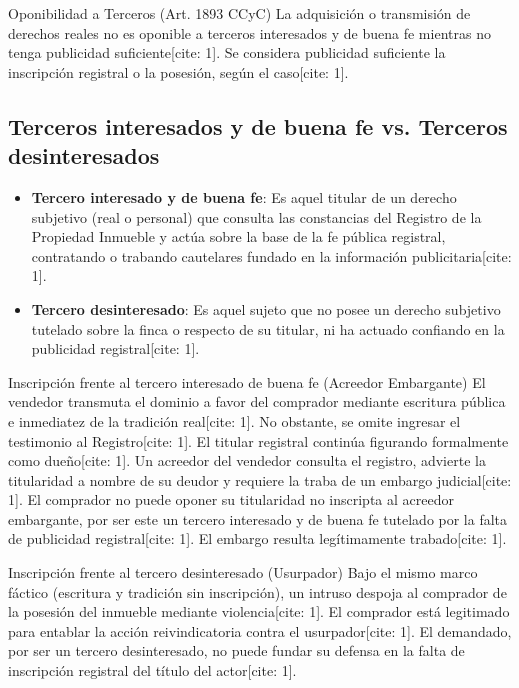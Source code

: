 \documentclass[12pt,oneside]{book}
\begin{document}
\begin{definition}{Oponibilidad a Terceros (Art. 1893 CCyC)}
La adquisición o transmisión de derechos reales no es oponible a terceros interesados y de buena fe mientras no tenga publicidad suficiente[cite: 1]. Se considera publicidad suficiente la inscripción registral o la posesión, según el caso[cite: 1].
\end{definition}

\subsection{Terceros interesados y de buena fe vs. Terceros desinteresados}

\begin{itemize}
    \item \textbf{Tercero interesado y de buena fe}: Es aquel titular de un derecho subjetivo (real o personal) que consulta las constancias del Registro de la Propiedad Inmueble y actúa sobre la base de la fe pública registral, contratando o trabando cautelares fundado en la información publicitaria[cite: 1].
    \item \textbf{Tercero desinteresado}: Es aquel sujeto que no posee un derecho subjetivo tutelado sobre la finca o respecto de su titular, ni ha actuado confiando en la publicidad registral[cite: 1].
\end{itemize}

\begin{example}{Inscripción frente al tercero interesado de buena fe (Acreedor Embargante)}
El vendedor transmuta el dominio a favor del comprador mediante escritura pública e inmediatez de la tradición real[cite: 1]. No obstante, se omite ingresar el testimonio al Registro[cite: 1]. El titular registral continúa figurando formalmente como dueño[cite: 1]. Un acreedor del vendedor consulta el registro, advierte la titularidad a nombre de su deudor y requiere la traba de un embargo judicial[cite: 1]. El comprador no puede oponer su titularidad no inscripta al acreedor embargante, por ser este un tercero interesado y de buena fe tutelado por la falta de publicidad registral[cite: 1]. El embargo resulta legítimamente trabado[cite: 1].
\end{example}

\begin{example}{Inscripción frente al tercero desinteresado (Usurpador)}
Bajo el mismo marco fáctico (escritura y tradición sin inscripción), un intruso despoja al comprador de la posesión del inmueble mediante violencia[cite: 1]. El comprador está legitimado para entablar la acción reivindicatoria contra el usurpador[cite: 1]. El demandado, por ser un tercero desinteresado, no puede fundar su defensa en la falta de inscripción registral del título del actor[cite: 1].
\end{example}
\end{document}
